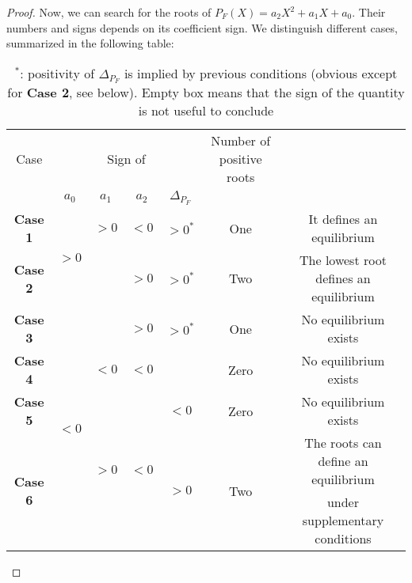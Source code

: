 \documentclass{article}
\newcommand{\lfw}{\lambda_{F}}
\newcommand{\lfw}{\lambda_{F}}
\newcommand{\cI}{\mathcal{I}}
\begin{document}
\begin{proof}
%

Now, we can search for the roots of $P_F(X) = a_2 X^2 + a_1 X + a_0$. Their numbers and signs depends on its coefficient sign. We distinguish different cases, summarized in the following table:


\begin{table}[!ht]
\centering
\begin{tabular}{c|c|c|c|c|c|c}
 Case & \multicolumn{4}{c|}{Sign of} & Number of positive roots   & \\
 & $a_0$ & $a_1$ & $a_2$ & $\Delta_{P_F}$ && \\
\hline
\textbf{Case 1} & \multirow{2}{*}{$>0$} & $>0$ & $< 0$ & $>0^*$ &One & It defines an equilibrium \\
\cline{3-7}
\textbf{Case 2} &  &  & $> 0$ & $>0^*$ &Two & The lowest root defines an equilibrium \\
\hline
\textbf{Case 3} & \multirow{5}{*}{$< 0$} &  & $> 0$ & $>0^*$ & One & No equilibrium exists \\
\cline{3-7}
\textbf{Case 4} &  & $<0$ & $< 0$ &  & Zero & No equilibrium exists \\
\cline{3-7}
\textbf{Case 5} & &\multirow{3}{*}{$ > 0$} & \multirow{3}{*}{$< 0$} & $<0$ &Zero &  No equilibrium exists\\
\cline{5-7}
\multirow{2}{*}{\textbf{Case 6}} & & & &\multirow{2}{*}{$>0$} &\multirow{2}{*}{Two} & The roots can define an equilibrium \\
& & & & & & under supplementary conditions
\end{tabular}
\caption{\centering $^*$: positivity of $\Delta_{P_F}$ is implied by previous conditions (obvious except for \textbf{Case 2}, see below). \newline Empty box means that the sign of the quantity is not useful to conclude}
\end{table}



\end{proof}
\end{document}
